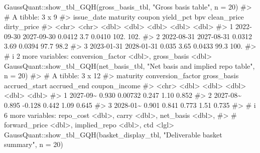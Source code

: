 \documentclass[
  letterpaper,
  DIV=11,
  numbers=noendperiod]{scrreprt}
\newenvironment{Shaded}{\begin{snugshade}}{\end{snugshade}}
\newcommand{\AttributeTok}[1]{\textcolor[rgb]{0.40,0.45,0.13}{#1}}
\newcommand{\CommentTok}[1]{\textcolor[rgb]{0.37,0.37,0.37}{#1}}
\newcommand{\DecValTok}[1]{\textcolor[rgb]{0.68,0.00,0.00}{#1}}
\newcommand{\FunctionTok}[1]{\textcolor[rgb]{0.28,0.35,0.67}{#1}}
\newcommand{\NormalTok}[1]{\textcolor[rgb]{0.00,0.23,0.31}{#1}}
\newcommand{\SpecialCharTok}[1]{\textcolor[rgb]{0.37,0.37,0.37}{#1}}
\newcommand{\StringTok}[1]{\textcolor[rgb]{0.13,0.47,0.30}{#1}}
\begin{document}
\begin{Shaded}
\begin{Highlighting}[]
\NormalTok{GaussQuant}\SpecialCharTok{::}\FunctionTok{show\_tbl\_GQH}\NormalTok{(gross\_basis\_tbl, }\StringTok{"Gross basis table"}\NormalTok{, }\AttributeTok{n =} \DecValTok{20}\NormalTok{)}
\CommentTok{\#\textgreater{} \# A tibble: 3 x 9}
\CommentTok{\#\textgreater{}   issue\_date maturity   coupon yield\_pct    bpv clean\_price dirty\_price}
\CommentTok{\#\textgreater{}   \textless{}chr\textgreater{}      \textless{}chr\textgreater{}       \textless{}dbl\textgreater{}     \textless{}dbl\textgreater{}  \textless{}dbl\textgreater{}       \textless{}dbl\textgreater{}       \textless{}dbl\textgreater{}}
\CommentTok{\#\textgreater{} 1 2022{-}09{-}30 2027{-}09{-}30 0.0412      3.7  0.0410       102.        102. }
\CommentTok{\#\textgreater{} 2 2022{-}08{-}31 2027{-}08{-}31 0.0312      3.69 0.0394        97.7        98.2}
\CommentTok{\#\textgreater{} 3 2023{-}01{-}31 2028{-}01{-}31 0.035       3.65 0.0433        99.3       100. }
\CommentTok{\#\textgreater{} \# i 2 more variables: conversion\_factor \textless{}dbl\textgreater{}, gross\_basis \textless{}dbl\textgreater{}}
\NormalTok{GaussQuant}\SpecialCharTok{::}\FunctionTok{show\_tbl\_GQH}\NormalTok{(net\_basis\_tbl, }\StringTok{"Net basis and implied repo table"}\NormalTok{, }\AttributeTok{n =} \DecValTok{20}\NormalTok{)}
\CommentTok{\#\textgreater{} \# A tibble: 3 x 12}
\CommentTok{\#\textgreater{}   maturity conversion\_factor gross\_basis accrued\_start accrued\_end coupon\_income}
\CommentTok{\#\textgreater{}   \textless{}chr\textgreater{}                \textless{}dbl\textgreater{}       \textless{}dbl\textgreater{}         \textless{}dbl\textgreater{}       \textless{}dbl\textgreater{}         \textless{}dbl\textgreater{}}
\CommentTok{\#\textgreater{} 1 2027{-}09\textasciitilde{}             0.930     0.00732         0.247        1.10         0.852}
\CommentTok{\#\textgreater{} 2 2027{-}08\textasciitilde{}             0.895    {-}0.128           0.442        1.09         0.645}
\CommentTok{\#\textgreater{} 3 2028{-}01\textasciitilde{}             0.901     0.841           0.773        1.51         0.735}
\CommentTok{\#\textgreater{} \# i 6 more variables: repo\_cost \textless{}dbl\textgreater{}, carry \textless{}dbl\textgreater{}, net\_basis \textless{}dbl\textgreater{},}
\CommentTok{\#\textgreater{} \#   forward\_price \textless{}dbl\textgreater{}, implied\_repo \textless{}dbl\textgreater{}, ctd \textless{}lgl\textgreater{}}
\NormalTok{GaussQuant}\SpecialCharTok{::}\FunctionTok{show\_tbl\_GQH}\NormalTok{(basket\_display\_tbl, }\StringTok{"Deliverable basket summary"}\NormalTok{, }\AttributeTok{n =} \DecValTok{20}\NormalTok{)}

\end{Highlighting}
\end{Shaded}
\end{document}
